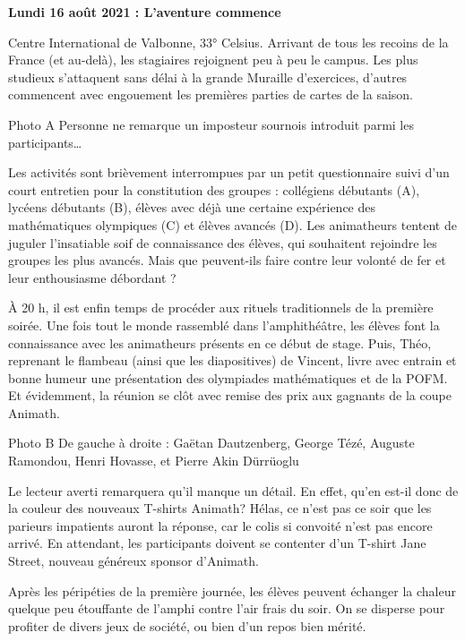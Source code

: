 \begin{center}
{\textbf{Lundi 16 août 2021 : L’aventure commence}}
\end{center}
\vspace{2mm}

Centre International de Valbonne, 33° Celsius. Arrivant de tous les recoins de la France (et au-delà), les stagiaires rejoignent peu à peu le campus. Les plus studieux s’attaquent sans délai à la grande Muraille d’exercices, d’autres commencent avec engouement les premières parties de cartes de la saison.

Photo A
Personne ne remarque un imposteur sournois introduit parmi les participants…

Les activités sont brièvement interrompues par un petit questionnaire suivi d’un court entretien pour la constitution des groupes : collégiens débutants (A), lycéens débutants (B), élèves avec déjà une certaine expérience des mathématiques olympiques (C) et élèves avancés (D). Les animatheurs tentent de juguler l’insatiable soif de connaissance des élèves, qui souhaitent rejoindre les groupes les plus avancés. Mais que peuvent-ils faire contre leur volonté de fer et leur enthousiasme débordant ?

À 20 h, il est enfin temps de procéder aux rituels traditionnels de la première soirée. Une fois tout le monde rassemblé dans l’amphithéâtre, les élèves font la connaissance avec les animatheurs présents en ce début de stage. Puis, Théo, reprenant le flambeau (ainsi que les diapositives) de Vincent, livre avec entrain et bonne humeur une présentation des olympiades mathématiques et de la POFM. Et évidemment, la réunion se clôt avec remise des prix aux gagnants de la coupe Animath.

Photo B
De gauche à droite : Gaëtan Dautzenberg, George Tézé, Auguste Ramondou, Henri Hovasse, et Pierre Akin Dürrüoglu

Le lecteur averti remarquera qu’il manque un détail. En effet, qu’en est-il donc de la couleur des nouveaux T-shirts Animath? Hélas, ce n’est pas ce soir que les parieurs impatients auront la réponse, car le colis si convoité n’est pas encore arrivé. En attendant, les participants doivent se contenter d’un T-shirt Jane Street, nouveau généreux sponsor d’Animath.

Après les péripéties de la première journée, les élèves peuvent échanger la chaleur quelque peu étouffante de l’amphi contre l’air frais du soir. On se disperse pour profiter de divers jeux de société, ou bien d’un repos bien mérité.